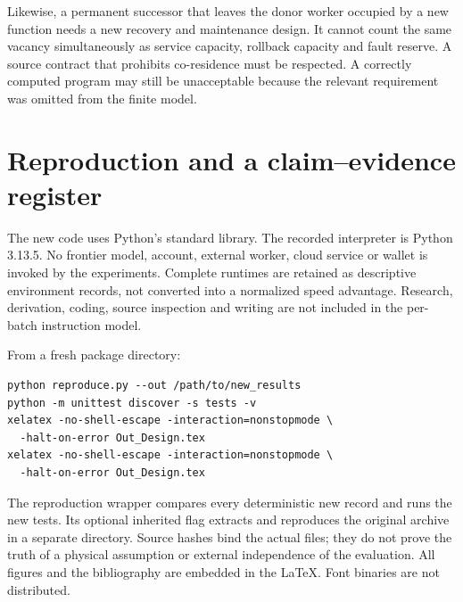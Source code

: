 \documentclass[11pt,letterpaper]{article}
\theoremstyle{definition}\newtheorem{definition}[theorem]{Definition}
\theoremstyle{remark}\newtheorem{remark}[theorem]{Remark}
\begin{document}
Likewise, a permanent successor that leaves the donor worker occupied by a new function needs a new recovery and maintenance design. It cannot count the same vacancy simultaneously as service capacity, rollback capacity and fault reserve. A source contract that prohibits co-residence must be respected. A correctly computed program may still be unacceptable because the relevant requirement was omitted from the finite model.

\section{Reproduction and a claim--evidence register}
\label{app:repro}
The new code uses Python's standard library. The recorded interpreter is Python 3.13.5. No frontier model, account, external worker, cloud service or wallet is invoked by the experiments. Complete runtimes are retained as descriptive environment records, not converted into a normalized speed advantage. Research, derivation, coding, source inspection and writing are not included in the per-batch instruction model.

From a fresh package directory:
\begin{verbatim}
python reproduce.py --out /path/to/new_results
python -m unittest discover -s tests -v
xelatex -no-shell-escape -interaction=nonstopmode \
  -halt-on-error Out_Design.tex
xelatex -no-shell-escape -interaction=nonstopmode \
  -halt-on-error Out_Design.tex
\end{verbatim}
The reproduction wrapper compares every deterministic new record and runs the new tests. Its optional inherited flag extracts and reproduces the original archive in a separate directory. Source hashes bind the actual files; they do not prove the truth of a physical assumption or external independence of the evaluation. All figures and the bibliography are embedded in the LaTeX. Font binaries are not distributed.

\clearpage
\end{document}
